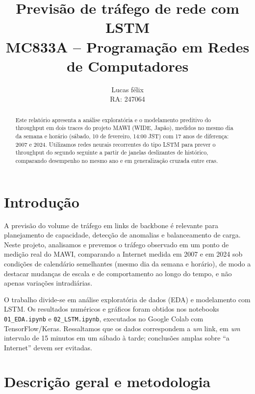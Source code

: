 \documentclass[12pt,a4paper]{article}
\title{Previsão de tráfego de rede com LSTM\\
\large MC833A -- Programação em Redes de Computadores}
\author{Lucas félix\\RA: 247064}
\begin{document}
\maketitle

\begin{abstract}
Este relatório apresenta a análise exploratória e o modelamento preditivo do throughput
em dois traces do projeto MAWI (WIDE, Japão), medidos no mesmo dia da semana e horário
(sábado, 10 de fevereiro, 14:00 JST) com 17 anos de diferença: 2007 e 2024.
Utilizamos redes neurais recorrentes do tipo LSTM para prever o throughput do segundo
seguinte a partir de janelas deslizantes de histórico, comparando desempenho no mesmo
ano e em generalização cruzada entre eras.
\end{abstract}

\section{Introdução}

A previsão do volume de tráfego em links de backbone é relevante para planejamento de
capacidade, detecção de anomalias e balanceamento de carga. Neste projeto, analisamos
e prevemos o tráfego observado em um ponto de medição real do MAWI, comparando a
Internet medida em 2007 e em 2024 sob condições de calendário semelhantes (mesmo dia da
semana e horário), de modo a destacar mudanças de escala e de comportamento ao longo do
tempo, e não apenas variações intradiárias.

O trabalho divide-se em análise exploratória de dados (EDA) e modelamento com LSTM.
Os resultados numéricos e gráficos foram obtidos nos notebooks
\texttt{01\_EDA.ipynb} e \texttt{02\_LSTM.ipynb}, executados no Google Colab com
TensorFlow/Keras. Ressaltamos que os dados correspondem a \emph{um} link, em \emph{um}
intervalo de 15 minutos em um sábado à tarde; conclusões amplas sobre ``a Internet''
devem ser evitadas.

\section{Descrição geral e metodologia}
\end{document}

